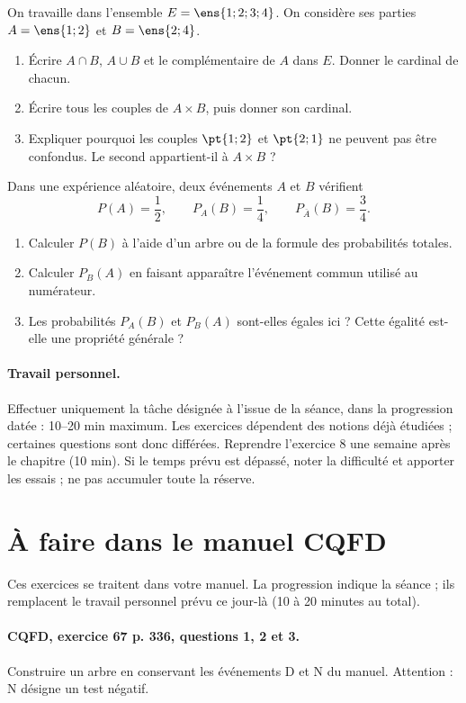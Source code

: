 On travaille dans l’ensemble $E=\ens{1;2;3;4}$. On considère ses parties $A=\ens{1;2}$ et $B=\ens{2;4}$.
\begin{enumerate}[label=\arabic*.]
\item Écrire $A\cap B$, $A\cup B$ et le complémentaire de $A$ dans $E$. Donner le cardinal de chacun.
\item Écrire tous les couples de $A\times B$, puis donner son cardinal.
\item Expliquer pourquoi les couples $\pt{1;2}$ et $\pt{2;1}$ ne peuvent pas être confondus. Le second appartient-il à $A\times B$ ?
\end{enumerate}
Dans une expérience aléatoire, deux événements $A$ et $B$ vérifient\[P(A)=\dfrac12,\qquad P_A(B)=\dfrac14,\qquad P_{\overline A}(B)=\dfrac34.\]
\begin{enumerate}[label=\arabic*.]
\item Calculer $P(B)$ à l’aide d’un arbre ou de la formule des probabilités totales.
\item Calculer $P_B(A)$ en faisant apparaître l’événement commun utilisé au numérateur.
\item Les probabilités $P_A(B)$ et $P_B(A)$ sont-elles égales ici ? Cette égalité est-elle une propriété générale ?
\end{enumerate}
\paragraph{Travail personnel.} Effectuer uniquement la tâche désignée à l’issue de la séance, dans la progression datée : 10–20 min maximum. Les exercices dépendent des notions déjà étudiées ; certaines questions sont donc différées. Reprendre l’exercice 8 une semaine après le chapitre (10 min). Si le temps prévu est dépassé, noter la difficulté et apporter les essais ; ne pas accumuler toute la réserve.
\endgroup
{}\section*{À faire dans le manuel CQFD}
Ces exercices se traitent dans votre manuel. La progression indique la séance ; ils remplacent le travail personnel prévu ce jour-là (10 à 20 minutes au total).
\paragraph{CQFD, exercice 67 p. 336, questions 1, 2 et 3.}\label{C05-M1} Construire un arbre en conservant les événements D et N du manuel. Attention : N désigne un test négatif.

